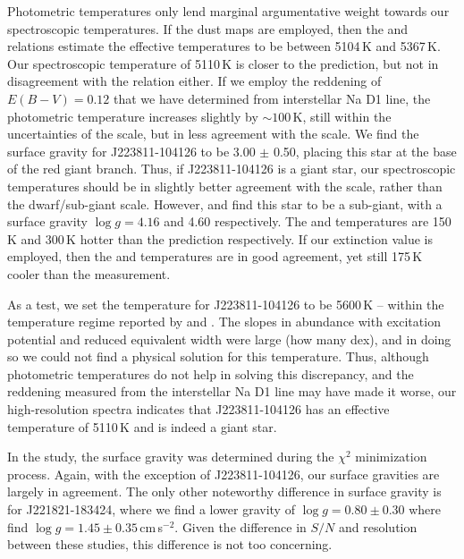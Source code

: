 \documentclass{emulateapj}
\begin{document}
Photometric temperatures only lend marginal argumentative weight towards our spectroscopic temperatures. If the \citet{schlegel;et-al_1998} dust maps are employed, then the \citet{alonso;et-al_1999} and \citet{casagrande;et-al_2010} relations estimate the effective temperatures to be between 5104\,K and 5367\,K. Our spectroscopic temperature of 5110\,K is closer to the \citet{alonso;et-al_1999} prediction, but not in disagreement with the \citet{casagrande;et-al_2010} relation either. If we employ the reddening of $E(B-V) = 0.12$ that we have determined from interstellar Na D1 line, the photometric temperature increases slightly by ${\sim}100$\,K, still within the uncertainties of the \citet{alonso;et-al_1999} scale, but in less agreement with the \citet{casagrande;et-al_2010} scale. We find the surface gravity for J223811-104126 to be 3.00 $\pm$ 0.50, placing this star at the base of the red giant branch. Thus, if J223811-104126 is a giant star, our spectroscopic temperatures should be in slightly better agreement with the \citet{alonso;et-al_1999} scale, rather than the \citet{casagrande;et-al_2010} dwarf/sub-giant scale. However, \citet{williams;et-al_2011} and \citet{wylie-de-boer;et-al_2012} find this star to be a sub-giant, with a surface gravity $\log{g} = 4.16$ and 4.60 respectively. The \citet{williams;et-al_2011} and \citet{wylie-de-boer;et-al_2012} temperatures are 150\,K and 300\,K hotter than the \citet{casagrande;et-al_2010} prediction respectively. If our extinction value is employed, then the \citet{williams;et-al_2011} and \citet{casagrande;et-al_2010} temperatures are in good agreement, yet still 175\,K cooler than the \citet{wylie-de-boer;et-al_2012} measurement.

As a test, we set the temperature for J223811-104126 to be 5600\,K -- within the temperature regime reported by \citet{williams;et-al_2011} and \citet{wylie-de-boer;et-al_2012}. The slopes in abundance with excitation potential and reduced equivalent width were large (how many dex), and in doing so we could not find a physical solution for this temperature. Thus, although photometric temperatures do not help in solving this discrepancy, and the reddening measured from the interstellar Na D1 line may have made it worse, our high-resolution spectra  indicates that J223811-104126 has an effective temperature of 5110\,K and is indeed a giant star.

In the \citet{wylie-de-boer;et-al_2012} study, the surface gravity was determined during the $\chi^2$ minimization process. Again, with the exception of J223811-104126, our surface gravities are largely in agreement. The only other noteworthy difference in surface gravity is for J221821-183424, where we find a lower gravity of $\log{g} = 0.80 \pm 0.30$ where \citet{wylie-de-boer;et-al_2012} find $\log{g} = 1.45 \pm 0.35$\,cm\,s$^{-2}$. Given the difference in $S/N$ and resolution between these studies, this difference is not too concerning. 
\end{document}
